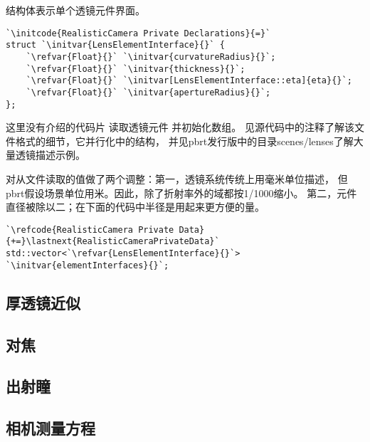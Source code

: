 结构体表示单个透镜元件界面。
\begin{lstlisting}
`\initcode{RealisticCamera Private Declarations}{=}`
struct `\initvar{LensElementInterface}{}` {
    `\refvar{Float}{}` `\initvar{curvatureRadius}{}`;
    `\refvar{Float}{}` `\initvar{thickness}{}`;
    `\refvar{Float}{}` `\initvar[LensElementInterface::eta]{eta}{}`;
    `\refvar{Float}{}` `\initvar{apertureRadius}{}`;
};
\end{lstlisting}

这里没有介绍的代码片
读取透镜元件
并初始化数组。
见源代码中的注释了解该文件格式的细节，它并行化中的结构，
并见pbrt发行版中的目录{\ttfamily scenes/lenses}了解大量透镜描述示例。

对从文件读取的值做了两个调整：第一，透镜系统传统上用毫米单位描述，
但pbrt假设场景单位用米。因此，除了折射率外的域都按1/1000缩小。
第二，元件直径被除以二；在下面的代码中半径是用起来更方便的量。
\begin{lstlisting}
`\refcode{RealisticCamera Private Data}{+=}\lastnext{RealisticCameraPrivateData}`
std::vector<`\refvar{LensElementInterface}{}`> `\initvar{elementInterfaces}{}`;
\end{lstlisting}


\subsection{厚透镜近似}\label{sub:厚透镜近似}
\subsection{对焦}\label{sub:对焦}
\subsection{出射瞳}\label{sub:出射瞳}
\subsection{相机测量方程}\label{sub:相机测量方程}
